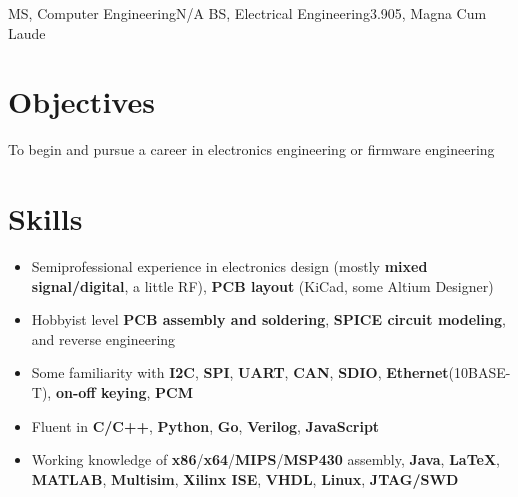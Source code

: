 \documentclass{my_resume}
\begin{document}

    {MS, Computer Engineering}{N/A}
	{BS, Electrical Engineering}{3.905, Magna Cum Laude}

\section{Objectives}
To begin and pursue a career in electronics engineering or firmware engineering

\section{Skills}
\begin{itemize}[noitemsep]
    \item Semiprofessional experience in electronics design (mostly \textbf{mixed signal/digital}, a little RF), \textbf{PCB layout} (KiCad, some Altium Designer)
    \item Hobbyist level \textbf{PCB assembly and soldering}, \textbf{SPICE circuit modeling}, and reverse engineering
    \item Some familiarity with \textbf{I2C}, \textbf{SPI}, \textbf{UART}, \textbf{CAN}, \textbf{SDIO}, \textbf{Ethernet}(10BASE-T), \textbf{on-off keying}, \textbf{PCM}
    \item Fluent in \textbf{C/C++}, \textbf{Python}, \textbf{Go}, \textbf{Verilog}, \textbf{JavaScript}
    \item Working knowledge of \textbf{x86}/\textbf{x64}/\textbf{MIPS}/\textbf{MSP430} assembly, \textbf{Java}, \textbf{LaTeX}, \textbf{MATLAB}, \textbf{Multisim}, \textbf{Xilinx ISE}, \textbf{VHDL}, \textbf{Linux}, \textbf{JTAG/SWD}
\end{itemize}
\end{document}
